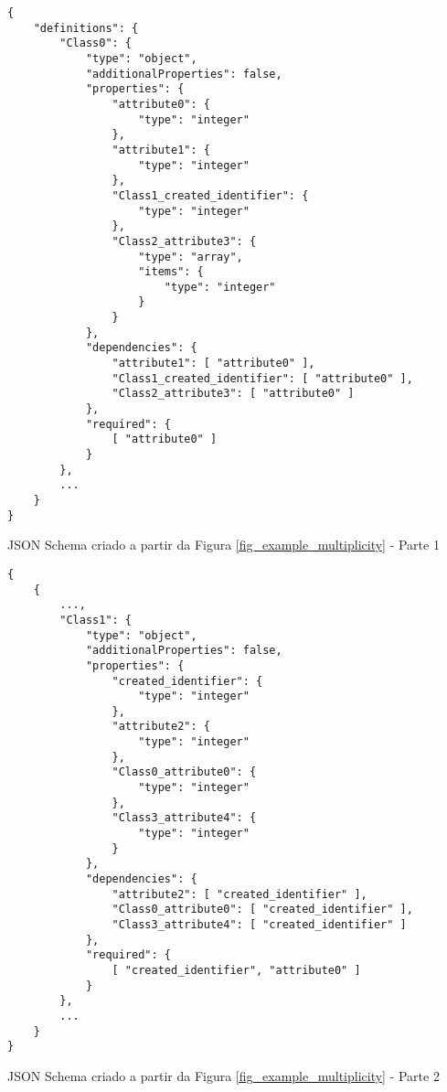 \begin{anexosenv}
\begin{listing}
\begin{verbatim}
{
    "definitions": {
        "Class0": {
            "type": "object",
            "additionalProperties": false,
            "properties": {
                "attribute0": {
                    "type": "integer"
                },
                "attribute1": {
                    "type": "integer"
                },
                "Class1_created_identifier": {
                    "type": "integer"
                },
                "Class2_attribute3": {
                    "type": "array",
                    "items": {
                        "type": "integer"
                    }
                }
            },
            "dependencies": {
                "attribute1": [ "attribute0" ],
                "Class1_created_identifier": [ "attribute0" ],
                "Class2_attribute3": [ "attribute0" ]
            },
            "required": { 
                [ "attribute0" ]
            }
        },
        ...
    }
}
\end{verbatim}
\caption{JSON Schema criado a partir da Figura \ref{fig_example_multiplicity} - Parte 1}
\end{listing}

\begin{listing}
\begin{verbatim}
{    
    {
        ...,
        "Class1": {
            "type": "object",
            "additionalProperties": false,
            "properties": {
                "created_identifier": {
                    "type": "integer"
                },
                "attribute2": {
                    "type": "integer"
                },
                "Class0_attribute0": {
                    "type": "integer"
                },
                "Class3_attribute4": {
                    "type": "integer"
                }
            },
            "dependencies": {
                "attribute2": [ "created_identifier" ],
                "Class0_attribute0": [ "created_identifier" ],
                "Class3_attribute4": [ "created_identifier" ]
            },
            "required": {
                [ "created_identifier", "attribute0" ]
            }
        },
        ...
    }
}
\end{verbatim}
\caption{JSON Schema criado a partir da Figura \ref{fig_example_multiplicity} - Parte 2}
\end{listing}


\end{anexosenv}
